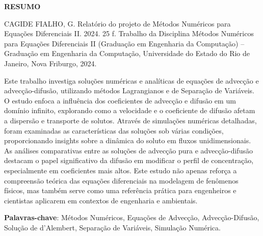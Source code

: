 \begin{titlepage}
    \thispagestyle{empty} %

    \begin{center}
        \textbf{\Large RESUMO}
    \end{center}

    \vspace{1cm} %

    \noindent CAGIDE FIALHO, G. Relatório do projeto de Métodos Numéricos para Equações Diferenciais II. 2024. 25 f. Trabalho da Disciplina Métodos Numéricos para Equações Diferenciais II (Graduação em Engenharia da Computação) – Graduação em Engenharia da Computação, Universidade do Estado do Rio de Janeiro, Nova Friburgo, 2024.

    \vspace{0.4cm} %

    Este trabalho investiga soluções numéricas e analíticas de equações de advecção e advecção-difusão, utilizando métodos Lagrangianos e de Separação de Variáveis. O estudo enfoca a influência dos coeficientes de advecção e difusão em um domínio infinito, explorando como a velocidade e o coeficiente de difusão afetam a dispersão e transporte de solutos. Através de simulações numéricas detalhadas, foram examinadas as características das soluções sob várias condições, proporcionando insights sobre a dinâmica do soluto em fluxos unidimensionais. As análises comparativas entre as soluções de advecção pura e advecção-difusão destacam o papel significativo da difusão em modificar o perfil de concentração, especialmente em coeficientes mais altos. Este estudo não apenas reforça a compreensão teórica das equações diferenciais na modelagem de fenômenos físicos, mas também serve como uma referência prática para engenheiros e cientistas aplicarem em contextos de engenharia e ambientais.

    \vspace{0.4cm} %

    \textbf{Palavras-chave}: Métodos Numéricos, Equações de Advecção, Advecção-Difusão, Solução de d’Alembert, Separação de Variáveis, Simulação Numérica.
\end{titlepage}
